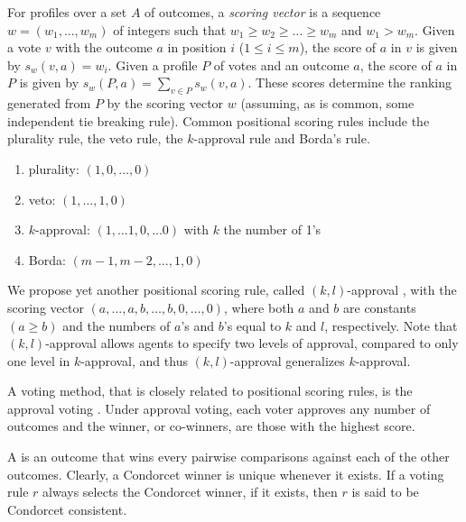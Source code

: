 For profiles over a set $A$ of outcomes, 
a \emph{scoring vector} is a sequence $w= (w_1,\ldots,
w_m)$ of integers such that $w_1\geq w_2 \geq \ldots \geq w_m$
and $w_1 > w_m$. Given a vote
$v$ with the outcome $a$ in position $i$ ($1 \leq i \leq m$), 
the score of $a$ in
$v$ is given
by $s_w(v,a)=w_i$. Given a profile $P$ of votes and an outcome $a$,
the score of $a$ in $P$ is given by $s_w(P,a) = \sum_{v\in P} s_w(v,a)$. 
These scores determine the ranking generated from $P$ by the scoring
vector $w$ (assuming, as is common, some independent tie breaking rule). 
Common positional scoring rules include the plurality rule,
the veto rule, the $k$-approval rule and Borda's rule.
\begin{enumerate} \itemsep -4pt
	\item plurality: $(1,0,\ldots,0)$
	\item veto: $(1,\ldots,1,0)$
	\item $k$-approval: $(1,\ldots 1,0,\ldots 0)$ with $k$ the number of 1's
	\item Borda: $(m-1,m-2,\ldots, 1,0)$
\end{enumerate}

We propose yet another positional scoring rule, called $(k,l)$-approval \cite{LiuT},
with the scoring vector $(a,\ldots,a,b,\ldots,b,0,\ldots,0)$, where
both $a$ and $b$ are constants $(a \geq b)$ and the numbers of $a$'s and $b$'s equal to
$k$ and $l$, respectively.
Note that $(k,l)$-approval allows agents to specify two levels of approval,
compared to only one level in $k$-approval, and thus $(k,l)$-approval
generalizes $k$-approval.

A voting method, that is closely related to positional scoring rules, is
the approval voting \cite{BraFis}.
Under approval voting, each voter approves any number of outcomes
and the winner, or co-winners, are those with the highest score.

A  is an outcome that wins every pairwise comparisons
against each of the other outcomes.
Clearly, a Condorcet winner is unique whenever it exists.
If a voting rule $r$ always selects the Condorcet winner,
if it exists, then $r$ is said to be Condorcet consistent.


